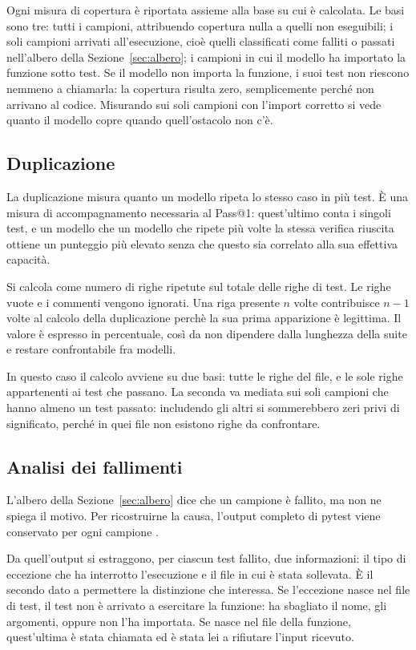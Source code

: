 Ogni misura di copertura è riportata assieme alla base su cui è calcolata. Le basi sono tre: tutti i campioni, attribuendo copertura nulla a quelli non eseguibili; i soli campioni arrivati all'esecuzione, cioè quelli classificati come falliti o passati nell'albero della Sezione~\ref{sec:albero}; i campioni in cui il modello ha importato la funzione sotto test. Se il modello non importa la funzione, i suoi test non riescono nemmeno a chiamarla: la copertura risulta zero, semplicemente perché non arrivano al codice. Misurando sui soli campioni con l'import corretto si vede quanto il modello copre quando quell'ostacolo non c'è.

\subsection{Duplicazione}
\label{sec:duplicazione}
La duplicazione misura quanto un modello ripeta lo stesso caso in più test. È una misura di accompagnamento necessaria al Pass@1: quest'ultimo conta i singoli test, e un modello che un modello che ripete più volte la stessa verifica riuscita ottiene un punteggio più elevato senza che questo sia correlato alla sua effettiva capacità.

Si calcola come numero di righe ripetute sul totale delle righe di test. Le righe vuote e i commenti vengono ignorati. Una riga presente $n$ volte contribuisce $n-1$ volte al calcolo della duplicazione perchè la sua prima apparizione è legittima. Il valore è espresso in percentuale, così da non dipendere dalla lunghezza della suite e restare confrontabile fra modelli.

In questo caso il calcolo avviene su due basi: tutte le righe del file, e
le sole righe appartenenti ai test che passano. La seconda va mediata sui soli
campioni che hanno almeno un test passato: includendo gli altri si sommerebbero
zeri privi di significato, perché in quei file non esistono righe da confrontare.

\subsection{Analisi dei fallimenti}
\label{sec:fallimenti}
L'albero della Sezione~\ref{sec:albero} dice che un campione è fallito, ma non ne spiega il motivo. Per ricostruirne la causa, l'output completo di pytest viene conservato per ogni campione .

Da quell'output si estraggono, per ciascun test fallito, due informazioni: il
tipo di eccezione che ha interrotto l'esecuzione e il file in cui è stata
sollevata. È il secondo dato a permettere la distinzione che interessa. Se
l'eccezione nasce nel file di test, il test non è arrivato a esercitare la
funzione: ha sbagliato il nome, gli argomenti, oppure non l'ha importata. Se
nasce nel file della funzione, quest'ultima è stata chiamata ed è stata lei a
rifiutare l'input ricevuto.

